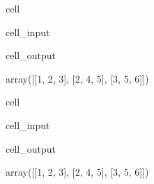 \documentclass[letterpaper,10pt,english]{jupyterBook}
\begin{document}
\begin{sphinxuseclass}{cell}\begin{sphinxVerbatimInput}

\begin{sphinxuseclass}{cell_input}
\begin{sphinxVerbatim}[commandchars=\\\{\}]
 \PYG{p}{[}\PYG{p}{[}    \PYG{p}{]}\PYG{p}{[}    \PYG{p}{]}\PYG{p}{[}  \PYG{p}{]}\PYG{p}{]}
\end{sphinxVerbatim}

\end{sphinxuseclass}\end{sphinxVerbatimInput}
\begin{sphinxVerbatimOutput}

\begin{sphinxuseclass}{cell_output}
\begin{sphinxVerbatim}[commandchars=\\\{\}]
array([[1, 2, 3],
       [2, 4, 5],
       [3, 5, 6]])
\end{sphinxVerbatim}

\end{sphinxuseclass}\end{sphinxVerbatimOutput}

\end{sphinxuseclass}
\begin{sphinxuseclass}{cell}\begin{sphinxVerbatimInput}

\begin{sphinxuseclass}{cell_input}
\begin{sphinxVerbatim}[commandchars=\\\{\}]
\end{sphinxVerbatim}

\end{sphinxuseclass}\end{sphinxVerbatimInput}
\begin{sphinxVerbatimOutput}

\begin{sphinxuseclass}{cell_output}
\begin{sphinxVerbatim}[commandchars=\\\{\}]
array([[1, 2, 3],
       [2, 4, 5],
       [3, 5, 6]])
\end{sphinxVerbatim}

\end{sphinxuseclass}\end{sphinxVerbatimOutput}

\end{sphinxuseclass}
\end{document}
